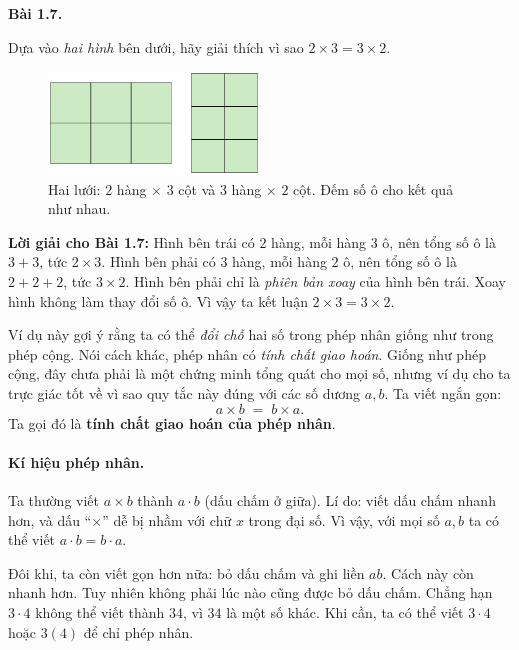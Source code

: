 \documentclass[14pt,a4paper]{extbook}
\newenvironment{problem}[1][]{
  \par\noindent\textbf{Bài #1.}\ \ignorespaces
}{\par}
\begin{document}
\begin{problem}[1.7]
Dựa vào \emph{hai hình} bên dưới, hãy giải thích vì sao \(2\times3=3\times2\).

\begin{figure}[ht!]
  \centering
  \includegraphics[width=0.50\textwidth]{img/fig-prob1.7.pdf}
  \caption*{\small Hai lưới: \(2\) hàng \(\times\) \(3\) cột và \(3\) hàng \(\times\) \(2\) cột.
  Đếm số ô cho kết quả như nhau.}
\end{figure}
\end{problem}

\noindent\textbf{Lời giải cho Bài 1.7:}  
Hình bên trái có \(2\) hàng, mỗi hàng \(3\) ô, nên tổng số ô là \(3+3\),
tức \(2\times3\).  
Hình bên phải có \(3\) hàng, mỗi hàng \(2\) ô, nên tổng số ô là \(2+2+2\),
tức \(3\times2\).  
Hình bên phải chỉ là \emph{phiên bản xoay} của hình bên trái. Xoay hình
không làm thay đổi số ô. Vì vậy ta kết luận \(2\times3=3\times2\).

Ví dụ này gợi ý rằng ta có thể \emph{đổi chỗ} hai số trong phép nhân
giống như trong phép cộng. Nói cách khác, phép nhân có \emph{tính chất
giao hoán}. Giống như phép cộng, đây chưa phải là một chứng minh tổng
quát cho mọi số, nhưng ví dụ cho ta trực giác tốt về vì sao quy tắc này
đúng với các số dương \(a,b\). Ta viết ngắn gọn:
\[
a\times b \;=\; b\times a.
\]
Ta gọi đó là \textbf{tính chất giao hoán của phép nhân}.


\paragraph{Kí hiệu phép nhân.}
Ta thường viết \(a\times b\) thành \(a\cdot b\) (dấu chấm ở giữa).
Lí do: viết dấu chấm nhanh hơn, và dấu “\(\times\)” dễ bị nhầm với
chữ \(x\) trong đại số. Vì vậy, với mọi số \(a,b\) ta có thể viết
\(a\cdot b=b\cdot a\).

Đôi khi, ta còn viết gọn hơn nữa: bỏ dấu chấm và ghi liền \(ab\).
Cách này còn nhanh hơn. Tuy nhiên không phải lúc nào cũng được bỏ
dấu chấm. Chẳng hạn \(3\cdot4\) không thể viết thành \(34\), vì
\(34\) là một số khác. Khi cần, ta có thể viết \(3\cdot4\) hoặc
\(3(4)\) để chỉ phép nhân.
\end{document}
